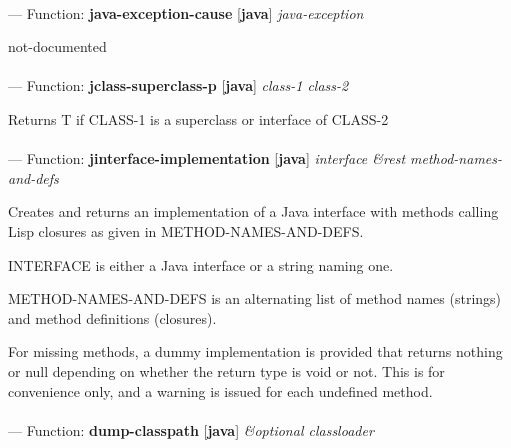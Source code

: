 \paragraph{}
\label{JAVA:JAVA-EXCEPTION-CAUSE}
--- Function: \textbf{java-exception-cause} [\textbf{java}] \textit{java-exception}

\begin{adjustwidth}{5em}{5em}
not-documented
\end{adjustwidth}

\paragraph{}
\label{JAVA:JCLASS-SUPERCLASS-P}
--- Function: \textbf{jclass-superclass-p} [\textbf{java}] \textit{class-1 class-2}

\begin{adjustwidth}{5em}{5em}
Returns T if CLASS-1 is a superclass or interface of CLASS-2
\end{adjustwidth}

\paragraph{}
\label{JAVA:JINTERFACE-IMPLEMENTATION}
--- Function: \textbf{jinterface-implementation} [\textbf{java}] \textit{interface \&rest method-names-and-defs}

\begin{adjustwidth}{5em}{5em}
Creates and returns an implementation of a Java interface with
   methods calling Lisp closures as given in METHOD-NAMES-AND-DEFS.

   INTERFACE is either a Java interface or a string naming one.

   METHOD-NAMES-AND-DEFS is an alternating list of method names
   (strings) and method definitions (closures).

   For missing methods, a dummy implementation is provided that
   returns nothing or null depending on whether the return type is
   void or not. This is for convenience only, and a warning is issued
   for each undefined method.
\end{adjustwidth}

\paragraph{}
\label{JAVA:DUMP-CLASSPATH}
--- Function: \textbf{dump-classpath} [\textbf{java}] \textit{\&optional classloader}

